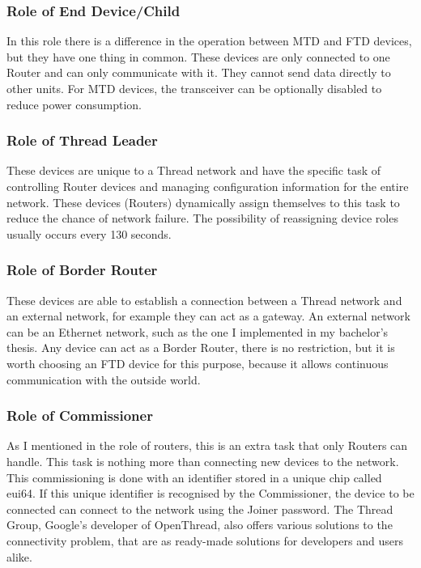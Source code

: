 \subsubsection{Role of End Device/Child}
In this role there is a difference in the operation between MTD and FTD devices, but they have one thing in common. These devices are only connected to one Router and can only communicate with it. They cannot send data directly to other units.
For MTD devices, the transceiver can be optionally disabled to reduce power consumption.

\subsubsection{Role of Thread Leader}
These devices are unique to a Thread network and have the specific task of controlling Router devices and managing configuration information for the entire network. These devices (Routers) dynamically assign themselves to this task to reduce the chance of network failure. The possibility of reassigning device roles usually occurs every 130 seconds. 

\subsubsection{Role of Border Router}
These devices are able to establish a connection between a Thread network and an external network, for example they can act as a gateway. An external network can be an Ethernet network, such as the one I implemented in my bachelor's thesis. Any device can act as a Border Router, there is no restriction, but it is worth choosing an FTD device for this purpose, because it allows continuous communication with the outside world. 

\subsubsection{Role of Commissioner}
As I mentioned in the role of routers, this is an extra task that only Routers can handle. This task is nothing more than connecting new devices to the network. This commissioning is done with an identifier stored in a unique chip called eui64. If this unique identifier is recognised by the Commissioner, the device to be connected can connect to the network using the Joiner password. The Thread Group, Google's developer of OpenThread, also offers various solutions to the connectivity problem, that are as ready-made solutions for developers and users alike.

